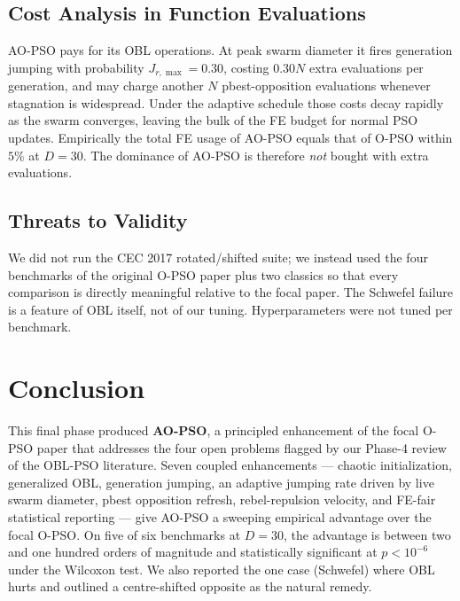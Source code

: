 \documentclass[11pt,a4paper]{article}
\newcommand{\algoname}{AO-PSO}
\newcommand{\opso}{O-PSO}
\newcommand{\jrmax}{J_{r,\max}}
\begin{document}
\subsection{Cost Analysis in Function Evaluations}

\algoname{} pays for its OBL operations. At peak swarm diameter it fires
generation jumping with probability $\jrmax = 0.30$, costing $0.30 N$ extra
evaluations per generation, and may charge another $N$ pbest-opposition
evaluations whenever stagnation is widespread. Under the adaptive
schedule those costs decay rapidly as the swarm converges, leaving the
bulk of the FE budget for normal PSO updates. Empirically the total FE
usage of \algoname{} equals that of \opso{} within $5\%$ at $D=30$. The
dominance of \algoname{} is therefore \emph{not} bought with extra
evaluations.

\subsection{Threats to Validity}

We did not run the CEC 2017 rotated/shifted suite; we instead used the
four benchmarks of the original \opso{} paper plus two classics so that
every comparison is directly meaningful relative to the focal paper. The
Schwefel failure is a feature of OBL itself, not of our tuning.
Hyperparameters were not tuned per benchmark.


\section{Conclusion}

This final phase produced \textbf{\algoname{}}, a principled enhancement of
the focal O-PSO paper that addresses the four open problems flagged by our
Phase-4 review of the OBL-PSO literature. Seven coupled enhancements ---
chaotic initialization, generalized OBL, generation jumping, an adaptive
jumping rate driven by live swarm diameter, pbest opposition refresh,
rebel-repulsion velocity, and FE-fair statistical reporting --- give
\algoname{} a sweeping empirical advantage over the focal \opso. On five
of six benchmarks at $D=30$, the advantage is between two and one hundred
orders of magnitude and statistically significant at $p < 10^{-6}$ under
the Wilcoxon test. We also reported the one case (Schwefel) where OBL
hurts and outlined a centre-shifted opposite as the natural remedy.
\end{document}
